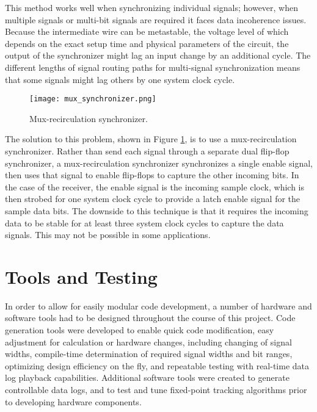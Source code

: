 \documentclass[12pt]{article}
\begin{document}
This method works well when synchronizing individual signals; however, when multiple signals or multi-bit signals are required it faces data incoherence issues. Because the intermediate wire can be metastable, the voltage level of which depends on the exact setup time and physical parameters of the circuit, the output of the synchronizer might lag an input change by an additional cycle. The different lengths of signal routing paths for multi-signal synchronization means that some signals might lag others  by one system clock cycle.

\begin{figure}
\centering
\texttt{[image: mux\_synchronizer.png]}
\caption{Mux-recirculation synchronizer.}
\label{img:mux synchronizer}
\end{figure}

The solution to this problem, shown in Figure \ref{img:mux synchronizer}, is to use a mux-recirculation synchronizer. \cite{verma} Rather than send each signal through a separate dual flip-flop synchronizer, a mux-recirculation synchronizer synchronizes a single enable signal, then uses that signal to enable flip-flops to capture the other incoming bits. In the case of the receiver, the enable signal is the incoming sample clock, which is then strobed for one system clock cycle to provide a latch enable signal for the sample data bits. The downside to this technique is that it requires the incoming data to be stable for at least three system clock cycles to capture the data signals. This may not be possible in some applications.

\section{Tools and Testing}
\label{sec:tools}
In order to allow for easily modular code development, a number of hardware and software tools had to be designed throughout the course of this project. Code generation tools were developed to enable quick code modification, easy adjustment for calculation or hardware changes, including changing of signal widths, compile-time determination of required signal widths and bit ranges, optimizing design efficiency on the fly, and repeatable testing with real-time data log playback capabilities. Additional software tools were created to generate controllable data logs, and to test and tune fixed-point tracking algorithms prior to developing hardware components.
\end{document}
